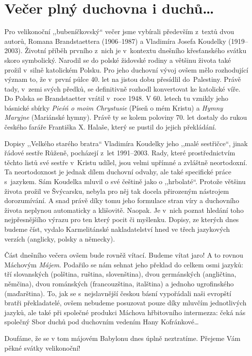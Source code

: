 \section{Večer plný duchovna i duchů\ldots}

\noindent
Pro velikonoční ,,bubeníčkovský`` večer jsme vybírali především z textů dvou autorů, Romana Brandstaettera (1906--1987) a Vladimíra Josefa Koudelky (1919--2003). Životní příběh prvního z nich je v kontextu dnešního křesťanského svátku skoro symbolický. Narodil se do polské židovské rodiny a většinu života také prožil v silně katolickém Polsku. Pro jeho duchovní vývoj ovšem mělo rozhodující význam to, že v první půlce 40. let na jistou dobu přesídlil do Palestiny. Právě tady, v zemi svých předků, se definitivně rozhodl konvertovat ke katolické víře. Do Polska se Brandstaetter vrátil v roce 1948. V 60. letech tu vznikly jeho básnické sbírky \textit{Pieśń o moim Chrystusie} (Píseň o mém Kristu) a \textit{Hymny Maryjne} (Mariánské hymny). Právě ty se kolem poloviny 70. let dostaly do rukou českého faráře Františka X. Halaše, který se pustil do jejich překládání.

Dopisy ,,Velkého starého bratra`` Vladimíra Koudelky jeho ,,malé sestřičce``, jinak řádové sestře Růženě, pocházejí z let 1991--2003. Rady, které prostřednictvím těchto listů své sestře v Kristu udílel, jsou velmi upřímné a zvláštně neortodoxní. Ta neortodoxnost je jednak dílem duchovní odvahy, ale také specifické práce s jazykem. Sám Koudelka mluvil o své češtině jako o ,,hrbolaté``. Protože většinu života prožil ve Švýcarsku, nebyla pro něj tak docela přirozeným nástrojem dorozumívání. A snad právě díky tomu jeho formulace stran víry a duchovního života neplynou automaticky a klišovitě. Naopak. Je v nich poznat hledání toho nejpřesnějšího výrazu pro ten který pocit či myšlenku. Dopisy, ze kterých dnes budeme číst, vydalo Karmelitánské nakladatelství hned ve třech jazykových verzích (anglicky, polsky a německy). 

Část dnešního večera ovšem bude rovněž vítací. Budeme vítat jaro! A to rovnou Máchovým \textit{Májem}. Podařilo se nám sehnat jeho překlad do celkem osmi jazyků: tří slovanských (polština, ruština, slovenština), dvou germánských (angličtina, němčina), dvou románských (francouzština, italština) a jednoho ugrofinského (maďarština). To, jak se s nejslavnější českou básní vypořádali naši evropští bratři překladatelé, ovšem nebudeme posuzovat pouze díky mluvčím jednotlivých jazyků, ale také při společné produkci Máchova hřbitovního intermezza: čeká nás společný Sbor duchů pod duchovním vedením Hany Kofránkové\ldots

Doufáme, že se v tom májovém Babylonu dnes úplně neztratíme. Přejeme Vám pěkné svátky velikonoční!

